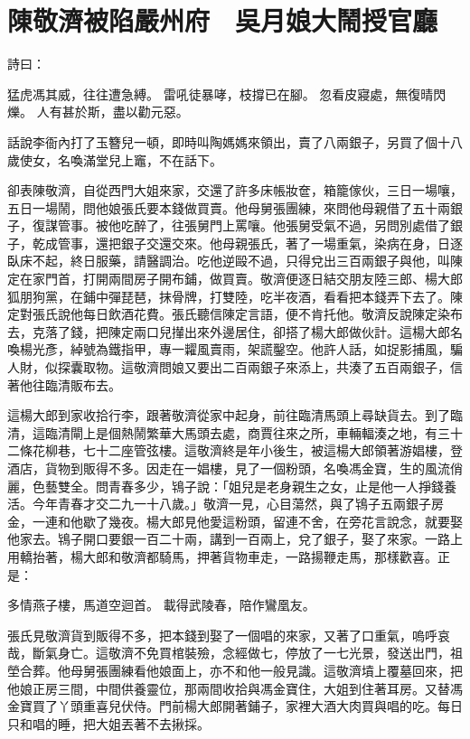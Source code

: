 %

\chapter{陳敬濟被陷嚴州府　吳月娘大鬧授官廳}

詩曰：

猛虎馮其威，往往遭急縛。
雷吼徒暴哮，枝撐已在腳。
忽看皮寢處，無復晴閃爍。
人有甚於斯，盡以勸元惡。

話說李衙內打了玉簪兒一頓，即時叫陶媽媽來領出，賣了八兩銀子，另買了個十八歲使女，名喚滿堂兒上竈，不在話下。

卻表陳敬濟，自從西門大姐來家，交還了許多床帳妝奩，箱籠傢伙，三日一場嚷，五日一場鬧，問他娘張氏要本錢做買賣。他母舅張團練，來問他母親借了五十兩銀子，復謀管事。被他吃醉了，往張舅門上罵嚷。他張舅受氣不過，另問別處借了銀子，乾成管事，還把銀子交還交來。他母親張氏，著了一場重氣，染病在身，日逐臥床不起，終日服藥，請醫調治。吃他逆毆不過，只得兌出三百兩銀子與他，叫陳定在家門首，打開兩間房子開布鋪，做買賣。敬濟便逐日結交朋友陸三郎、楊大郎狐朋狗黨，在鋪中彈琵琶，抹骨牌，打雙陸，吃半夜酒，看看把本錢弄下去了。陳定對張氏說他每日飲酒花費。張氏聽信陳定言語，便不肯托他。敬濟反說陳定染布去，克落了錢，把陳定兩口兒攆出來外邊居住，卻搭了楊大郎做伙計。這楊大郎名喚楊光彥，綽號為鐵指甲，專一糶風賣雨，架謊鑿空。他許人話，如捉影捕風，騙人財，似探囊取物。這敬濟問娘又要出二百兩銀子來添上，共湊了五百兩銀子，信著他往臨清販布去。

這楊大郎到家收拾行李，跟著敬濟從家中起身，前往臨清馬頭上尋缺貨去。到了臨清，這臨清閘上是個熱鬧繁華大馬頭去處，商賈往來之所，車輛輻湊之地，有三十二條花柳巷，七十二座管弦樓。這敬濟終是年小後生，被這楊大郎領著游娼樓，登酒店，貨物到販得不多。因走在一娼樓，見了一個粉頭，名喚馮金寶，生的風流俏麗，色藝雙全。問青春多少，鴇子說：「姐兒是老身親生之女，止是他一人掙錢養活。今年青春才交二九一十八歲。」敬濟一見，心目蕩然，與了鴇子五兩銀子房金，一連和他歇了幾夜。楊大郎見他愛這粉頭，留連不舍，在旁花言說念，就要娶他家去。鴇子開口要銀一百二十兩，講到一百兩上，兌了銀子，娶了來家。一路上用轎抬著，楊大郎和敬濟都騎馬，押著貨物車走，一路揚鞭走馬，那樣歡喜。正是：

多情燕子樓，馬道空迴首。
載得武陵春，陪作鸞凰友。

張氏見敬濟貨到販得不多，把本錢到娶了一個唱的來家，又著了口重氣，嗚呼哀哉，斷氣身亡。這敬濟不免買棺裝殮，念經做七，停放了一七光景，發送出門，祖塋合葬。他母舅張團練看他娘面上，亦不和他一般見識。這敬濟墳上覆墓回來，把他娘正房三間，中間供養靈位，那兩間收拾與馮金寶住，大姐到住著耳房。又替馮金寶買了丫頭重喜兒伏侍。門前楊大郎開著鋪子，家裡大酒大肉買與唱的吃。每日只和唱的睡，把大姐丟著不去揪採。

